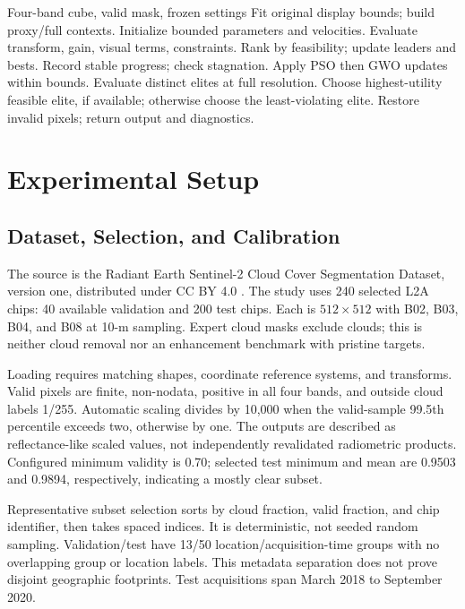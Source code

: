 \documentclass[conference]{IEEEtran}
\begin{document}
\begin{algorithm}[t]
\caption{Shared-gain enhancement with elite checking}
\label{alg:search}
\begin{algorithmic}[1]
\REQUIRE Four-band cube, valid mask, frozen settings
\STATE Fit original display bounds; build proxy/full contexts.
\STATE Initialize bounded parameters and velocities.
\STATE Evaluate transform, gain, visual terms, constraints.
\STATE Rank by feasibility; update leaders and bests.
\STATE Record stable progress; check stagnation.
\STATE Apply PSO then GWO updates within bounds.
\ENDFOR
\STATE Evaluate distinct elites at full resolution.
\STATE Choose highest-utility feasible elite, if available;
\STATE otherwise choose the least-violating elite.
\STATE Restore invalid pixels; return output and diagnostics.
\end{algorithmic}
\end{algorithm}

\section{Experimental Setup}
\label{sec:setup}
\subsection{Dataset, Selection, and Calibration}
The source is the Radiant Earth Sentinel-2 Cloud Cover Segmentation Dataset, version one, distributed under CC BY 4.0 \cite{radiant2022}. The study uses 240 selected L2A chips: 40 available validation and 200 test chips. Each is $512\times512$ with B02, B03, B04, and B08 at 10-m sampling. Expert cloud masks exclude clouds; this is neither cloud removal nor an enhancement benchmark with pristine targets.

Loading requires matching shapes, coordinate reference systems, and transforms. Valid pixels are finite, non-nodata, positive in all four bands, and outside cloud labels 1/255. Automatic scaling divides by 10,000 when the valid-sample 99.5th percentile exceeds two, otherwise by one. The outputs are described as reflectance-like scaled values, not independently revalidated radiometric products. Configured minimum validity is 0.70; selected test minimum and mean are 0.9503 and 0.9894, respectively, indicating a mostly clear subset.

Representative subset selection sorts by cloud fraction, valid fraction, and chip identifier, then takes spaced indices. It is deterministic, not seeded random sampling. Validation/test have 13/50 location/acquisition-time groups with no overlapping group or location labels. This metadata separation does not prove disjoint geographic footprints. Test acquisitions span March 2018 to September 2020.
\end{document}
